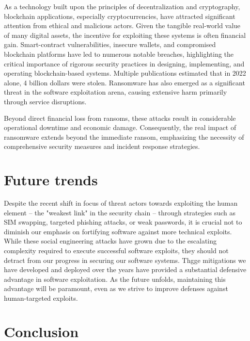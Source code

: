 \documentclass{article}
\begin{document}
As a technology built upon the principles of decentralization and cryptography, blockchain applications, especially cryptocurrencies, have attracted significant attention from ethical and malicious actors. Given the tangible real-world value of many digital assets, the incentive for exploiting these systems is often financial gain. Smart-contract vulnerabilities, insecure wallets, and compromised blockchain platforms have led to numerous notable breaches, highlighting the critical importance of rigorous security practices in designing, implementing, and operating blockchain-based systems. Multiple publications estimated that in 2022 alone, 4 billion dollars were stolen. Ransomware has also emerged as a significant threat in the software exploitation arena, causing extensive harm primarily through service disruptions.

Beyond direct financial loss from ransoms, these attacks result in considerable operational downtime and economic damage. Consequently, the real impact of ransomware extends beyond the immediate ransom, emphasizing the necessity of comprehensive security measures and incident response strategies.

\section{Future trends}%
Despite the recent shift in focus of threat actors towards exploiting the human element -- the "weakest link" in the security chain -- through strategies such as SIM swapping, targeted phishing attacks, or weak passwords, it is crucial not to diminish our emphasis on fortifying software against more technical exploits. While these social engineering attacks have grown due to the escalating complexity required to execute successful software exploits, they should not detract from our progress in securing our software systems. Thgge mitigations we have developed and deployed over the years have provided a substantial defensive advantage in software exploitation. As the future unfolds, maintaining this advantage will be paramount, even as we strive to improve defenses against human-targeted exploits.

\section{Conclusion}

\printbibheading
\printbibliography
\end{document}
